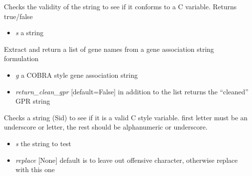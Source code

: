 \documentclass[a4paper,11pt,english]{sphinxmanual}
\begin{document}

\begin{fulllineitems}
\label{modules_doc:cbmpy.CBCommon.checkId}
Checks the validity of the string to see if it conforms to a C variable. Returns true/false
\begin{itemize}
\item {} 
\emph{s} a string

\end{itemize}

\end{fulllineitems}


\begin{fulllineitems}
\label{modules_doc:cbmpy.CBCommon.extractGeneIdsFromString}
Extract and return a list of gene names from a gene association string formulation
\begin{itemize}
\item {} 
\emph{g} a COBRA style gene association string

\item {} 
\emph{return\_clean\_gpr} {[}default=False{]} in addition to the list returns the ``cleaned'' GPR string

\end{itemize}

\end{fulllineitems}


\begin{fulllineitems}
\label{modules_doc:cbmpy.CBCommon.fixId}
Checks a string (Sid) to see if it is a valid C style variable. first letter must be an underscore or letter,
the rest should be alphanumeric or underscore.
\begin{itemize}
\item {} 
\emph{s} the string to test

\item {} 
\emph{replace} {[}None{]} default is to leave out offensive character, otherwise replace with this one

\end{itemize}

\end{fulllineitems}
\end{document}
